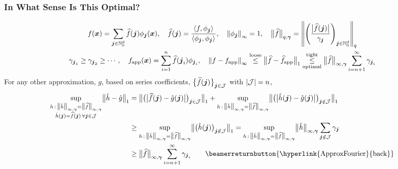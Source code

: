\documentclass[11pt,compress,xcolor={usenames,dvipsnames},aspectratio=169]{beamer}
\newcommand{\fappx}{f_{\text{app}}}
\newcommand{\hfappx}{\widehat{f}_{\text{app}}}
\begin{document}
\begin{frame}[label = OptimalProof]
\frametitle{In What Sense Is This Optimal?}
\vspace{-7ex}
\begin{gather*}
f(\vx) = \sum_{\vj \in \natzero^d} \hf(\vj) \phi_{\vj}(\vx), \quad \hf(\vj) = \frac{\ip{f}{\phi_{\vj}}}{\ip{\phi_{\vj}}{\phi_{\vj}}}, 
 \quad \norm[\infty]{\phi_{\vj}}=1, \quad
\bignorm[q,\vgamma]{\hf} = \norm[q]{\left( \frac{\bigabs{\hf(\vj)}}{\gamma_{\vj}} \right)_{\vj \in \natzero^d}}
\\
\gamma_{\vj_1} \ge \gamma_{\vj_2} \ge \cdots, \quad
\fappx(\vx) = \sum_{i=1}^{n} \hf(\vj_i) \phi_{\vj_i}, \quad
\norm[\infty]{f - \fappx}
\overset{\text{loose}}{\le}  \bignorm[1]{\hf - \hfappx} \underset{\text{optimal}}{\overset{\text{tight}}{\le}} \bignorm[\infty,\vgamma]{\hf} \sum_{i = n+1}^{\infty}  \gamma_{\vj_{i}}
\end{gather*}
For \alert{any other} approximation, $g$, based on series coefficients, $\bigl\{\widehat{f}(\boldsymbol{j}) \bigr\}_{\boldsymbol{j} \in \mathcal{J}}$ with $\left \lvert \mathcal{J} \right \rvert = n$,
\begin{align*}
\sup_{\substack{h\, : \,{\mathlarger \lVert} \hh {\mathlarger  \rVert}_{\infty,\vgamma} = {\mathlarger \lVert} \hf {\mathlarger  \rVert}_{\infty,\vgamma} \\ \hh(\vj) = \hf(\vj) \, \forall \vj \in \cj 
}} \bignorm[1]{\hh - \hg} 
&=  
\bignorm[1]{\bigl(\bigabs{\hf(\vj) -  \hg(\vj)} \bigr)_{\vj \in \cj}}
+
\sup_{h\, : \, 	{\mathlarger \lVert} \hh {\mathlarger  \rVert}_{\infty,\vgamma} = {\mathlarger \lVert} \hf {\mathlarger  \rVert}_{\infty,\vgamma} }  
\bignorm[1]{\bigl(\bigabs{\hh(\vj) -  \hg(\vj)} \bigr)_{\vj \notin \cj}}
\\
& 
\ge \sup_{h\, : \, 	{\mathlarger \lVert} \hh {\mathlarger  \rVert}_{\infty,\vgamma} = {\mathlarger \lVert} \hf {\mathlarger  \rVert}_{\infty,\vgamma} }  
\bignorm[1]{\bigl(\hh(\vj) \bigr)_{\vj \notin \cj}}
=  \sup_{h\, : \, 	{\mathlarger \lVert} \hh {\mathlarger  \rVert}_{\infty,\vgamma} = {\mathlarger \lVert} \hf {\mathlarger  \rVert}_{\infty,\vgamma} }  
\bignorm[\infty,\vgamma]{\hh} \sum_{\vj \notin \cj}  \gamma_{\vj} \\
&
\ge \bignorm[\infty,\vgamma]{\hf} \sum_{i = n+1}^{\infty}  \gamma_{\vj_{i}} \qquad \text{\beamerreturnbutton{\hyperlink{ApproxFourier}{back}}}
\end{align*}
\end{frame}
\end{document}
